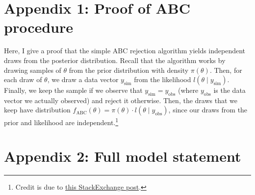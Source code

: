 \documentclass[
]{book}
\begin{document}
\hypertarget{appendix-1-proof-of-abc-procedure}{%
\section{Appendix 1: Proof of ABC procedure}\label{appendix-1-proof-of-abc-procedure}}

Here, I give a proof that the simple ABC rejection algorithm yields independent draws from the posterior distribution. Recall that the algorithm works by drawing samples of \(\theta\) from the prior distribution with density \(\pi (\theta)\). Then, for each draw of \(\theta\), we draw a data vector \(y_{\text {sim}}\) from the likelihood \(l(\theta \mid y_{\text{sim}})\). Finally, we keep the sample if we observe that \(y_{\text{sim}} = y_{\text{obs}}\) (where \(y_{\text{obs}}\) is the data vector we actually observed) and reject it otherwise. Then, the draws that we keep have distribution \(f_{\text{ABC}}(\theta) = \pi(\theta) \cdot l(\theta \mid y_{\text{obs}})\), since our draws from the prior and likelihood are independent.\footnote{Credit is due to \href{https://stats.stackexchange.com/questions/380076/proof-of-approximate-exact-bayesian-computation.}{this StackExchange post}.}

\hypertarget{appendix-2-full-model-statement}{%
\section{Appendix 2: Full model statement}\label{appendix-2-full-model-statement}}
\end{document}
